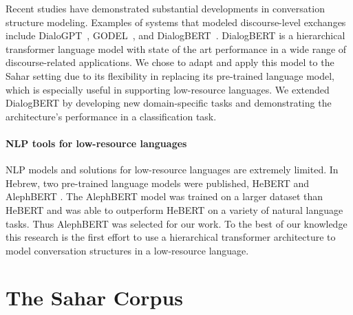 \documentclass[letterpaper]{article} %
\begin{document}


Recent studies have  demonstrated substantial developments in  conversation structure modeling. Examples of systems that modeled discourse-level exchanges include DialoGPT~\cite{zhang2019dialogpt}, GODEL~\cite{peng2022godel}, and DialogBERT~\cite{gu2021dialogbert}.
DialogBERT is a hierarchical transformer language  model  with state of the art performance in a wide range of discourse-related applications. We chose to adapt and apply this model to the Sahar setting  due to its flexibility in replacing its pre-trained language model, which is especially useful in supporting low-resource languages. We extended DialogBERT by developing new domain-specific tasks and demonstrating the architecture's performance in a classification task.


\paragraph{NLP tools for low-resource languages}
NLP models and solutions for low-resource languages are extremely limited.
In Hebrew, two pre-trained language models were published, HeBERT\cite{chriquiHeBERTHebEMOHebrew2021} and AlephBERT \cite{seker2022alephbert}. The AlephBERT model was trained on a larger dataset than HeBERT and was able to outperform HeBERT on a variety of natural language tasks. Thus AlephBERT was selected for our work. To the best of our knowledge this research is the first effort to use a hierarchical transformer architecture to model conversation structures in a low-resource language.

\section{The Sahar Corpus}
\end{document}
